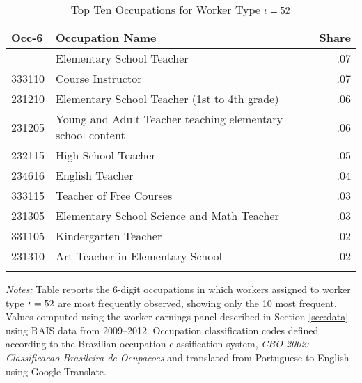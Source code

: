\begin{table}[tbp] \centering
{}

\caption{Top Ten Occupations for Worker Type $\iota=52$}
\label{occ_counts_iota557}
\begin{tabularx}{\textwidth}{llr}

\toprule
{Occ-6}&{Occupation Name}&{Share} \tabularnewline
\midrule\addlinespace[1.5ex]
331205&Elementary School Teacher &.07 \tabularnewline
333110&Course Instructor&.07 \tabularnewline
231210&Elementary School Teacher (1st to 4th grade)&.06 \tabularnewline
231205&Young and Adult Teacher teaching elementary school content \hspace{.3cm} &.06 \tabularnewline
232115&High School Teacher&.05 \tabularnewline
234616&English Teacher&.04 \tabularnewline
333115&Teacher of Free Courses&.03 \tabularnewline
231305&Elementary School Science and Math Teacher&.03 \tabularnewline
331105&Kindergarten Teacher &.02 \tabularnewline
231310&Art Teacher in Elementary School&.02 \tabularnewline
\bottomrule \addlinespace[1.5ex]
\end{tabularx}
\footnotesize\flushleft \emph{Notes:} Table reports the 6-digit occupations in which workers assigned to worker type $\iota=52$ are most frequently observed, showing only the 10 most frequent. Values computed using the worker earnings panel described in Section \ref{sec:data} using RAIS data from 2009--2012. Occupation classification codes defined according to the Brazilian occupation classification system, \emph{CBO 2002: Classificacao Brasileira de Ocupacoes} and translated from Portuguese to English using Google Translate.  
\end{table}
